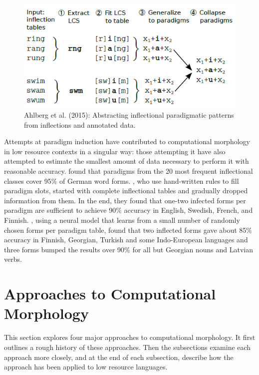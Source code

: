 \documentclass[12pt]{article}
\begin{document}
\begin{figure}[ht]
\begin{center}
\includegraphics[width=0.7\columnwidth]{Ahlberg2015-LCS.PNG}
\caption{Ahlberg et al. (2015): Abstracting inflectional paradigmatic patterns from inflections and annotated data.}
\label{fig:LCS}
\end{center}
\end{figure}

Attempts at paradigm induction have  contributed to computational morphology in low resource contexts in a singular way: those attempting it have also attempted to estimate the smallest amount of data necessary to perform it with reasonable accuracy.  found that paradigms from the 20 most frequent inflectional classes cover 95\% of German word forms. , who use hand-written rules to fill paradigm slots, started with complete inflectional tables and gradually dropped information from them. In the end, they found that one-two infected forms per paradigm are sufficient to achieve 90\% accuracy in English, Swedish, French, and Finnish. , using a neural model that learns from a small number of randomly chosen forms per paradigm table, found that two inflected forms gave about 85\% accuracy in Finnish, Georgian, Turkish and some Indo-European languages and three forms bumped the results over 90\% for all but Georgian nouns and Latvian verbs.

\section{Approaches to Computational Morphology}
\label{compMorph}

This section explores four major approaches to computational morphology. It first outlines a rough history of these approaches. Then the subsections examine each approach more closely, and at the end of each subsection, describe how the approach has been applied to low resource languages. 
\end{document}
